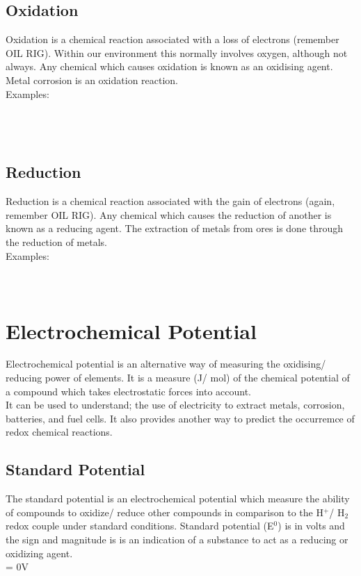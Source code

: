 \documentclass[a4paper, 12pt]{article}
\begin{document}
		\subsection{Oxidation}
			Oxidation is a chemical reaction associated with a loss of electrons (remember OIL RIG). Within our environment this normally involves oxygen, although not always. Any chemical which causes oxidation is known as an oxidising agent. Metal corrosion is an oxidation reaction. \\
			Examples: \\
			 \\
			 \\
			 \\

		\subsection{Reduction}
			Reduction is a chemical reaction associated with the gain of electrons (again, remember OIL RIG). Any chemical which causes the reduction of another is known as a reducing agent. The extraction of metals from ores is done through the reduction of metals. \\
			Examples: \\
			 \\
			 \\
			
	\newpage
			
	\section{Electrochemical Potential}
		Electrochemical potential is an alternative way of measuring the oxidising/ reducing power of elements. It is a measure (J/ mol) of the chemical potential of a compound which takes electrostatic forces into account. \\
		It can be used to understand; the use of electricity to extract metals, corrosion, batteries, and fuel cells. It also provides another way to predict the occurremce of redox chemical reactions. 
		
		\subsection{Standard Potential}
			The standard potential is an electrochemical potential which measure the ability of compounds to oxidize/ reduce other compounds in comparison to the H$^+$/ H$_2$ redox couple under standard conditions. Standard potential (E$^0$) is in volts and the sign and magnitude is is an indication of a substance to act as a reducing or oxidizing agent. \\
			 = 0V \\
			
\end{document}
